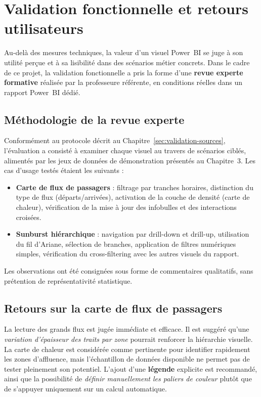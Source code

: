\section{Validation fonctionnelle et retours utilisateurs}
\label{sec:validation-fonctionnelle}

Au-delà des mesures techniques, la valeur d’un visuel Power~BI se juge à son utilité perçue et à sa lisibilité dans des scénarios métier concrets. 
Dans le cadre de ce projet, la validation fonctionnelle a pris la forme d’une \textbf{revue experte formative} réalisée par la professeure référente, 
en conditions réelles dans un rapport Power~BI dédié.

\subsection{Méthodologie de la revue experte}

Conformément au protocole décrit au Chapitre~\ref{sec:validation-sources}, 
l’évaluation a consisté à examiner chaque visuel au travers de scénarios ciblés, 
alimentés par les jeux de données de démonstration présentés au Chapitre~3. 
Les cas d’usage testés étaient les suivants :
\begin{itemize}[nosep]
  \item \textbf{Carte de flux de passagers} : filtrage par tranches horaires, distinction du type de flux (départs/arrivées), activation de la couche de densité (carte de chaleur), vérification de la mise à jour des infobulles et des interactions croisées.
  \item \textbf{Sunburst hiérarchique} : navigation par drill-down et drill-up, utilisation du fil d’Ariane, sélection de branches, application de filtres numériques simples, vérification du cross-filtering avec les autres visuels du rapport.
\end{itemize}
Les observations ont été consignées sous forme de commentaires qualitatifs, 
sans prétention de représentativité statistique.

\subsection{Retours sur la carte de flux de passagers}

La lecture des grands flux est jugée immédiate et efficace. 
Il est suggéré qu’une \textit{variation d’épaisseur des traits par zone} pourrait renforcer la hiérarchie visuelle. 
La carte de chaleur est considérée comme pertinente pour identifier rapidement les zones d’affluence, 
mais l’échantillon de données disponible ne permet pas de tester pleinement son potentiel. 
L’ajout d’une \textbf{légende} explicite est recommandé, ainsi que la possibilité de 
\textit{définir manuellement les paliers de couleur} plutôt que de s’appuyer uniquement sur un calcul automatique.

